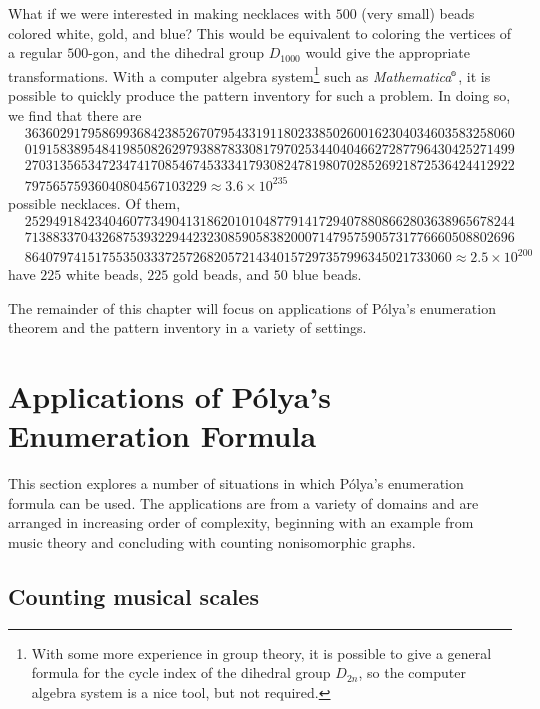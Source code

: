 What if we were interested in making necklaces with $500$ (very small)
beads colored white, gold, and blue? This would be equivalent to
coloring the vertices of a regular $500$-gon, and the dihedral group
$D_{1000}$ would give the appropriate transformations. With a computer
algebra system\footnote{With some more experience in group theory, it
  is possible to give a general formula for the cycle index of the
  dihedral group $D_{2n}$, so the computer algebra system is a nice
  tool, but not required.}  such as
\emph{Mathematica}$^\text{\tiny\textregistered}$, it is possible to quickly
produce the pattern inventory for such a problem. In doing so, we find
that there are \begin{align*}
  &3636029179586993684238526707954331911802338502600162304034603583258060\\
  &0191583895484198508262979388783308179702534404046627287796430425271499\\
  &2703135653472347417085467453334179308247819807028526921872536424412922\\
  &79756575936040804567103229 \approx 3.6\times 10^{235}\end{align*}
possible necklaces. Of them,
\begin{align*}
  &2529491842340460773490413186201010487791417294078808662803638965678244\\
  &7138833704326875393229442323085905838200071479575905731776660508802696\\
  &8640797415175535033372572682057214340157297357996345021733060\approx
  2.5\times 10^{200}
\end{align*}
have $225$ white beads, $225$ gold beads, and $50$ blue beads.

The remainder of this chapter will focus on applications of P\'olya's
enumeration theorem and the pattern inventory in a variety of
settings.

\section{Applications of P\'olya's Enumeration
  Formula}\label{s:polya:apps}

This section explores a number of situations in which P\'olya's
enumeration formula can be used. The applications are from a variety
of domains and are arranged in increasing order of complexity,
beginning with an example from music theory and concluding with
counting nonisomorphic graphs.

\subsection{Counting musical scales}\label{ss:polya:scales}

